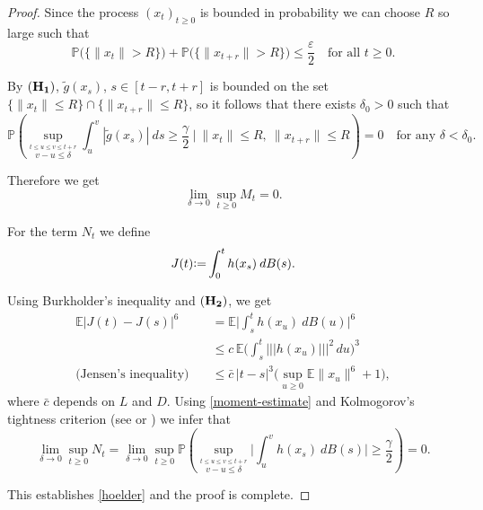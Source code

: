 \documentclass[11pt,reqno,draft]{amsart}
\begin{document}
\begin{proof}
\noindent Since the process $(x_t)_{t\geq 0}$ is bounded in
probability we can choose $R$ so large such that
$$
{\mathbb P}\Big(\{ \|x_t\|>R\}\Big)+{\mathbb P}\Big(\{ \|x_{t+r}\|>R\}\Big)\leq
\frac{\varepsilon} 2\quad \mbox{for all $t\geq 0$}.
$$

\noindent By ${\bf(H_1)}$, ${\widetilde{g}}(x_s)$, $s\in [t-r,t+r]$ is bounded
on the set $\{\|x_t\|\leq R\}\cap\{\|x_{t+r}\|\leq R\}$, so it follows
that there exists $\delta_0>0$ such that
$$
{\mathbb P}\left( \sup\limits_{{\stackrel{t\leq u\leq v\leq t+r}{v-u\leq
\delta}}}\int_u^v|{\widetilde{g}}(x_s)|\:ds\geq \frac\gamma 2
\:\Big|\:\|x_t\|\leq R,\:\|x_{t+r}\|\leq R \right)=0\quad\mbox{for
any $\delta<\delta_0$}.
$$

\noindent Therefore we get
$$
\lim\limits_{\delta\to 0} \sup\limits_{t\ge 0} M_t=0.
$$

\noindent For the term $N_t$ we define
$$
J(t){\mathrel{\mathrm{\raise0.1ex\hbox{:}\hbox{=}\strut}}} \int_0^t h(x_s)\:dB(s).
$$

\noindent Using Burkholder's inequality and ${\bf(H_2)}$, we get
\begin{equation*}
\begin{split}
{\mathbb E}|J(t)-J(s)|^{6}&={\mathbb E}\Big|\int_{s}^{t}h(x_u)\:dB(u)\Big|^{6}\\
&\leq c\, {\mathbb E}\Big(\int_{s}^{t}{|\!|\!|{h(x_u)}|\!|\!|}^2\,du\Big)^{3}\\
\mbox{(Jensen's inequality)}\quad &\leq \bar c\, |t-s|^{3} \big(\sup\limits_{u\geq 0}{\mathbb E}\|x_u\|^{6}+1\big),
\end{split}
\end{equation*}
where $\bar c$ depends on $L$ and $D$.
Using \eqref{moment-estimate} and Kolmogorov's
tightness criterion (see \cite[2.4.11]{KS} or \cite{S09}) we infer that
$$
\lim\limits_{\delta\to 0}\sup\limits_{t\ge 0}N_t=
\lim\limits_{\delta\to 0}\sup\limits_{t\ge 0}{\mathbb P}\left(
\sup\limits_{{\stackrel{t\leq u\leq v\leq t+r}{v-u\leq
\delta}}}\Big|\int_u^v h(x_s)\:dB(s)\Big|\geq \frac\gamma
2\right)=0.
$$

\noindent This establishes \eqref{hoelder} and the proof is
complete.
\end{proof}
\end{document}
